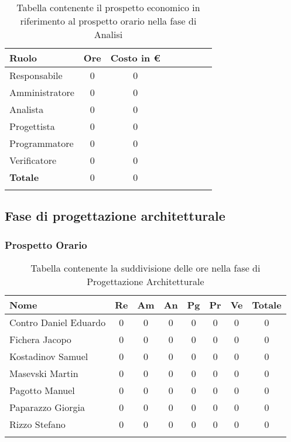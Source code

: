 \documentclass[../piano_di_progetto.tex]{subfiles}
\begin{document}
\begin{longtable}{|l|c|c|c|c|c|c|c|}
	\hline
	\rowcolor{lightgray}
	\textbf{Ruolo} & \textbf{Ore} & \textbf{Costo in €}\\
	\endhead
	\hline
	Responsabile & 0 & 0 \\
	\hline
	Amministratore & 0 & 0 \\
	\hline
	Analista & 0 & 0 \\
	\hline
	Progettista & 0 & 0 \\
	\hline
	Programmatore & 0 & 0 \\
	\hline
	Verificatore & 0 & 0 \\
	\hline
	\textbf{Totale} & 0 & 0 \\
	\hline
	\caption{Tabella contenente il prospetto economico in riferimento al prospetto orario nella fase di Analisi} 
\end{longtable}


\subsection{ Fase di progettazione architetturale}%
\label{sub:fase_prog_arc}
\subsubsection{Prospetto Orario}

\begin{center}
	\begin{longtable}{|l|c|c|c|c|c|c|c|}
		\hline
		\rowcolor{lightgray}
		\textbf{Nome} & \textbf{Re} & \textbf{Am} & \textbf{An} & \textbf{Pg}  & \textbf{Pr}   & \textbf{Ve} & \textbf{Totale} \\

		\hline
			Contro Daniel Eduardo & 0 &0&0&0&0&0 & 0 \\
		\hline
			Fichera Jacopo &  0 &0&0&0&0&0 & 0 \\
		\hline
			Kostadinov Samuel &  0 &0&0&0&0&0 & 0 \\			
		\hline
			Masevski Martin 	&  0 &0&0&0&0&0 & 0\\
		\hline
			Pagotto Manuel &  0 &0&0&0&0&0 & 0 \\			
		\hline
			Paparazzo Giorgia &  0 &0&0&0&0&0 & 0 \\
		\hline
			Rizzo Stefano &  0 &0&0&0&0&0 & 0\\
		\hline	

		\caption{Tabella contenente la suddivisione delle ore nella fase di Progettazione Architetturale}
	\end{longtable}
\end{center}
\end{document}
